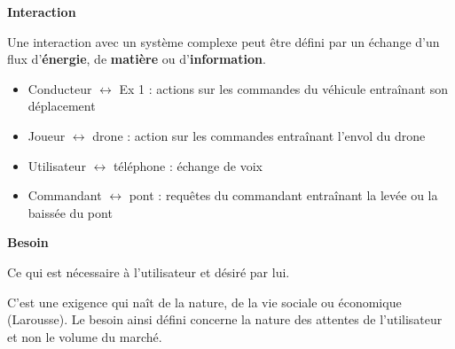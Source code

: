 \documentclass[11pt,oneside]{article}
\begin{document}
\begin{defi}
\textbf{Interaction}

Une interaction avec un système complexe peut être défini par un échange d'un flux d'\textbf{énergie}, de \textbf{matière} ou d'\textbf{information}.
\end{defi}

\begin{exemple}
\begin{itemize}
\item Conducteur $\leftrightarrow$ Ex 1 : actions sur les commandes du véhicule entraînant son déplacement
\item Joueur $\leftrightarrow$ drone : action sur les commandes entraînant l'envol du drone
\item Utilisateur $\leftrightarrow$ téléphone : échange de voix
\item Commandant $\leftrightarrow$ pont : requêtes du commandant entraînant la levée ou la baissée du pont
\end{itemize}
\end{exemple}


\begin{defi}
\textbf{Besoin}\cite{norme}

Ce qui est nécessaire à l'utilisateur et désiré par lui.


C’est une exigence qui naît de la nature, de la vie sociale ou économique (Larousse). Le besoin ainsi défini concerne la nature des attentes de l'utilisateur et non le volume du marché.

\end{defi}
\end{document}

